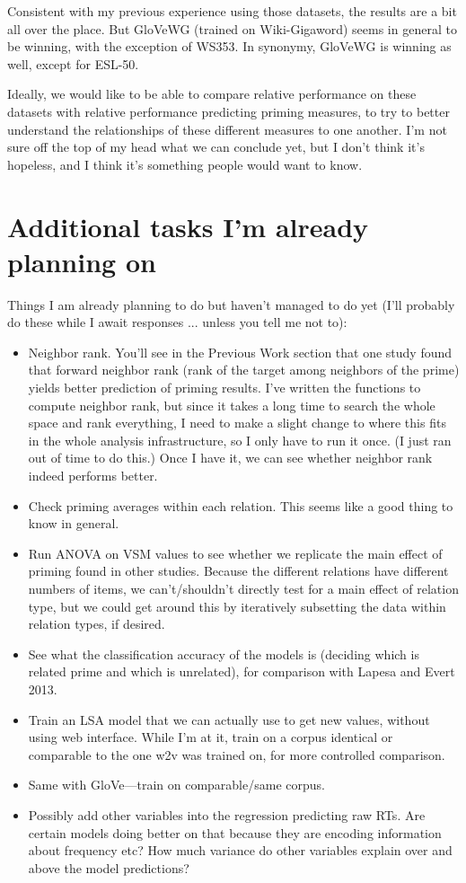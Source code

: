 \documentclass{article}
\begin{document}
\begin{enumerate}[1)]
Consistent with my previous experience using those datasets, the results are a bit all over the place. But GloVeWG (trained on Wiki-Gigaword) seems in general to be winning, with the exception of WS353. In synonymy, GloVeWG is winning as well, except for ESL-50. 

Ideally, we would like to be able to compare relative performance on these datasets with relative performance predicting priming measures, to try to better understand the relationships of these different measures to one another. I'm not sure off the top of my head what we can conclude yet, but I don't think it's hopeless, and I think it's something people would want to know.

\end{enumerate}

\section{Additional tasks I'm already planning on}
Things I am already planning to do but haven't managed to do yet (I'll probably do these while I await responses ... unless you tell me not to):
\begin{itemize}
\item Neighbor rank. You'll see in the Previous Work section that one study found that forward neighbor rank (rank of the target among neighbors of the prime) yields better prediction of priming results.  I've written the functions to compute neighbor rank, but since it takes a long time to search the whole space and rank everything, I need to make a slight change to where this fits in the whole analysis infrastructure, so I only have to run it once. (I just ran out of time to do this.) Once I have it, we can see whether neighbor rank indeed performs better.
\item Check priming averages within each relation. This seems like a good thing to know in general.
\item Run ANOVA on VSM values to see whether we replicate the main effect of priming found in other studies. Because the different relations have different numbers of items, we can't/shouldn't directly test for a main effect of relation type, but we could get around this by iteratively subsetting the data within relation types, if desired.
\item See what the classification accuracy of the models is (deciding which is related prime and which is unrelated), for comparison with Lapesa and Evert 2013. 
\item Train an LSA model that we can actually use to get new values, without using web interface. While I'm at it, train on a corpus identical or comparable to the one w2v was trained on, for more controlled comparison.
\item Same with GloVe---train on comparable/same corpus.
\item Possibly add other variables into the regression predicting raw RTs. Are certain models doing better on that because they are encoding information about frequency etc? How much variance do other variables explain over and above the model predictions?
\end{itemize}
\end{document}
